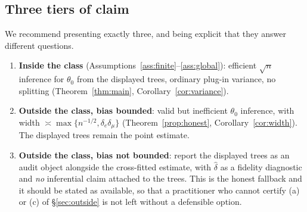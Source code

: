 \documentclass[11pt]{article}
\theoremstyle{plain}
\theoremstyle{definition}
\theoremstyle{remark}
\begin{document}
\subsection{Three tiers of claim}

We recommend presenting exactly three, and being explicit that they answer
different questions.

\begin{enumerate}[leftmargin=*,label=\textbf{T\arabic*.}]
  \item \textbf{Inside the class} (Assumptions~\ref{ass:finite}--\ref{ass:global}):
  efficient $\sqrt n$ inference for $\theta_0$ from the displayed trees, ordinary
  plug-in variance, no splitting (Theorem~\ref{thm:main},
  Corollary~\ref{cor:variance}).
  \item \textbf{Outside the class, bias bounded}: valid but inefficient $\theta_0$
  inference, with width $\asymp\max\{n^{-1/2},\delta_e\delta_\mu\}$
  (Theorem~\ref{prop:honest}, Corollary~\ref{cor:width}). The displayed trees
  remain the point estimate.
  \item \textbf{Outside the class, bias not bounded}: report the displayed trees
  as an audit object alongside the cross-fitted estimate, with $\widehat\delta$ as
  a fidelity diagnostic and \emph{no} inferential claim attached to the trees.
  This is the honest fallback and it should be stated as available, so that a
  practitioner who cannot certify (a) or (c) of \S\ref{sec:outside} is not left
  without a defensible option.
\end{enumerate}
\end{document}
